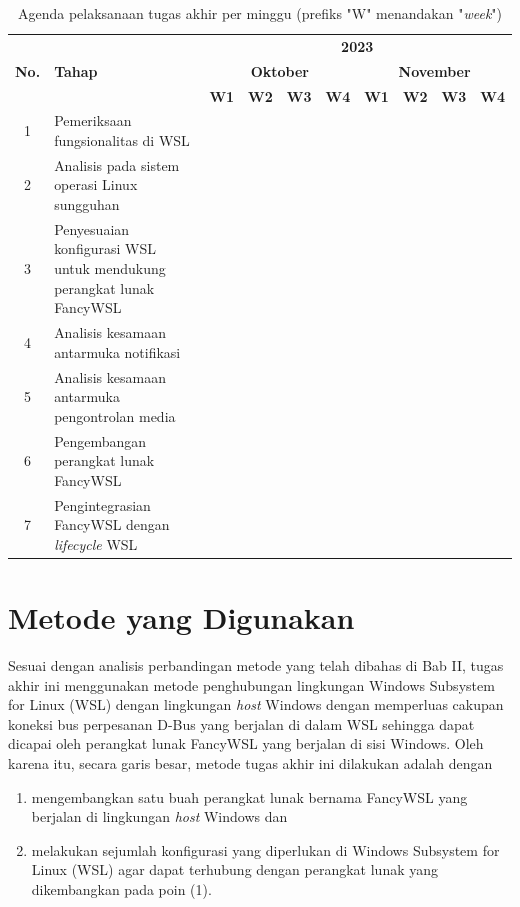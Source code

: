 \begin{table}
    \centering
    \caption{Agenda pelaksanaan tugas akhir per minggu (prefiks "W" menandakan "\textit{week}")}
    \begin{tabular}{|c|p{4cm}|c|c|c|c|c|c|c|c|} \hline 
        \multirow{3}{*}{\textbf{No.}} & \multirow{3}{*}{\textbf{Tahap}} & \multicolumn{8}{c|}{\textbf{2023}}\\ \cline{3-10} 
        & & \multicolumn{4}{c|}{\textbf{Oktober}} & \multicolumn{4}{c|}{\textbf{November}}\\ \cline{3-10} 
        & & \textbf{W1} & \textbf{W2} & \textbf{W3} & \textbf{W4} & \textbf{W1} & \textbf{W2} & \textbf{W3} & \textbf{W4}\\ \hline 
        1 & Pemeriksaan fungsionalitas di WSL & \cellcolor{black} &  &  &  &  &  &  & \\ \hline 
        2 & Analisis pada sistem operasi Linux sungguhan & \cellcolor{black} & \cellcolor{black} &  &  &  &  &  & \\ \hline 
        3 & Penyesuaian konfigurasi WSL untuk mendukung perangkat lunak FancyWSL &  &  & \cellcolor{black} & \cellcolor{black} &  &  &  & \\ \hline 
        4 & Analisis kesamaan antarmuka notifikasi &  &  & \cellcolor{black} & \cellcolor{black} & \cellcolor{black} & &  & \\ \hline 
        5 & Analisis kesamaan antarmuka pengontrolan media &  &  & \cellcolor{black} & \cellcolor{black} & \cellcolor{black} &  &  & \\ \hline 
        6 & Pengembangan perangkat lunak FancyWSL &  &  &  &  & \cellcolor{black} & \cellcolor{black} & \cellcolor{black} & \cellcolor{black}\\ \hline 
        7 & Pengintegrasian FancyWSL dengan \textit{lifecycle} WSL &  &  &  &  &  &  &  & \cellcolor{black}\\ \hline 
    \end{tabular}
    \label{tabel-agenda-pelaksanaan}
\end{table}

\section{Metode yang Digunakan}

Sesuai dengan analisis perbandingan metode yang telah dibahas di Bab II, tugas akhir ini menggunakan metode penghubungan lingkungan Windows Subsystem for Linux (WSL) dengan lingkungan \textit{host} Windows dengan memperluas cakupan koneksi bus perpesanan D-Bus yang berjalan di dalam WSL sehingga dapat dicapai oleh perangkat lunak FancyWSL yang berjalan di sisi Windows. Oleh karena itu, secara garis besar, metode tugas akhir ini dilakukan adalah dengan
\begin{enumerate}
    \item mengembangkan satu buah perangkat lunak bernama FancyWSL yang berjalan di lingkungan \textit{host} Windows dan
    \item melakukan sejumlah konfigurasi yang diperlukan di Windows Subsystem for Linux (WSL) agar dapat terhubung dengan perangkat lunak yang dikembangkan pada poin (1).
\end{enumerate}

